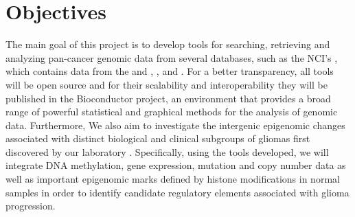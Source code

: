 
\newcommand{\comando}[1]{\textbf{$\backslash$#1}}


\section{Objectives}

The main goal of this project is to develop tools for searching, retrieving and
analyzing pan-cancer genomic data from several databases, such as the NCI's
, which contains data from the 
and ,
, and
.
For a better transparency, all tools will be open source and for their
scalability and interoperability they will be published in the Bioconductor project,
an environment that provides a broad range of powerful statistical and graphical methods
for the analysis of genomic data.
Furthermore, We also aim to investigate the intergenic epigenomic changes
associated with distinct biological and clinical subgroups of gliomas first
discovered by our laboratory \cite{ceccarelli2016molecular}. Specifically,
using the tools developed, we will integrate DNA methylation, gene expression,
mutation and copy number data as well as important epigenomic marks defined by
histone modifications in normal samples in order to identify candidate regulatory
elements associated with glioma progression.


